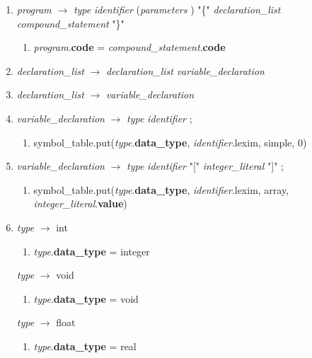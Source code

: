 \documentclass[12pt]{article}
\begin{document}
\begin{enumerate}[label = \arabic*.]
\item \textit{program} $\rightarrow$ \textit{type} \textit{identifier} (\textit{parameters} ) "\{" \textit{declaration\_list} \textit{compound\_statement} "\}"
\begin{enumerate}[label = \roman*.]
\item \textit{program}.\textbf{code} = \textit{compound\_statement}.\textbf{code}
\end{enumerate}

\item \textit{declaration\_list} $\rightarrow$ \textit{declaration\_list} \textit{variable\_declaration}

\item \textit{ declaration\_list } $\rightarrow$ \textit{ variable\_declaration }

\item \textit{ variable\_declaration } $\rightarrow$ \textit{type} \textit{identifier} ;
\begin{enumerate}[label = \roman*.]
\item symbol\_table.put(\textit{type}.\textbf{data\_type}, \textit{identifier}.lexim, simple, 0)
\end{enumerate}

\item \textit{ variable\_declaration } $\rightarrow$ \textit{ type } \textit{ identifier } "[" \textit{ integer\_literal } "]" ;
\begin{enumerate}[label = \roman*.]
\item symbol\_table.put(\textit{type}.\textbf{data\_type}, \textit{identifier}.lexim, array, \textit{integer\_literal}.\textbf{value})
\end{enumerate}

\item \textit{ type } $\rightarrow$ int
\begin{enumerate}[label = \roman*.]
\item \textit{type}.\textbf{data\_type} = integer
\end{enumerate}

\textit{ type } $\rightarrow$ void
\begin{enumerate}[label = \roman*.]
\item \textit{type}.\textbf{data\_type} = void
\end{enumerate}

\textit{ type } $\rightarrow$ float
\begin{enumerate}[label = \roman*.]
\item \textit{type}.\textbf{data\_type} = real
\end{enumerate}


\end{enumerate}
\end{document}
